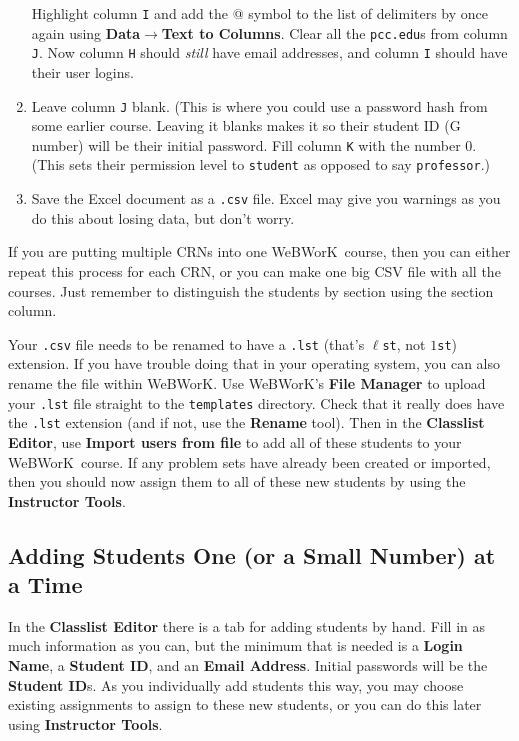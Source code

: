 \documentclass[12pt]{article}
\newcommand{\menu}[1]{\textbf{#1}}
\newcommand{\WW}{WeBWorK}
\begin{document}
\begin{enumerate}
	      Highlight column \texttt{I} and add the @ symbol to the list of delimiters by once again using \menu{Data}$\rightarrow$\menu{Text to Columns}.
	      Clear all the \texttt{pcc.edu}s from column \texttt{J}.
	      Now column \texttt{H} should \emph{still} have email addresses, and column \texttt{I} should have their user logins.
	\item Leave column \texttt{J} blank. (This is where you could use a password hash from some earlier course.
	      Leaving it blanks makes it so their student ID (G number) will be their initial password.
	      Fill column \texttt{K} with the number 0.
	      (This sets their permission level to \texttt{student} as opposed to say \texttt{professor}.)
	\item Save the Excel document as a \texttt{.csv} file.
	      Excel may give you warnings as you do this about losing data, but don't worry.
\end{enumerate}

If you are putting multiple CRNs into one \WW\ course, then you can either repeat this process for each CRN, or you can make one big CSV file with all the courses.
Just remember to distinguish the students by section using the section column.

Your \texttt{.csv} file needs to be renamed to have a \texttt{.lst} (that's $\ell$\texttt{st}, not $1$\texttt{st}) extension.
If you have trouble doing that in your operating system, you can also rename the file within \WW.
Use \WW's \menu{File Manager} to upload your \texttt{.lst} file straight to the \texttt{templates} directory.
Check that it really does have the \texttt{.lst} extension (and if not, use the \menu{Rename} tool).
Then in the \menu{Classlist Editor}, use \menu{Import users from file} to add all of these students to your \WW\ course.
If any problem sets have already been created or imported, then you should now assign them to all of these new students by using the \menu{Instructor Tools}.

\subsection{Adding Students One (or a Small Number) at a Time}
In the \menu{Classlist Editor} there is a tab for adding students by hand.
Fill in as much information as you can, but the minimum that is needed is a \menu{Login Name}, a \menu{Student ID}, and an \menu{Email Address}.
Initial passwords will be the \menu{Student ID}s.
As you individually add students this way, you may choose existing assignments to assign to these new students, or you can do this later using \menu{Instructor Tools}.
\end{document}
